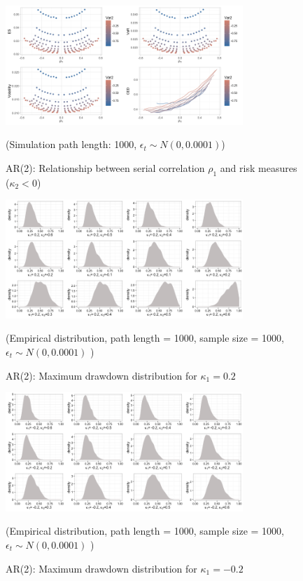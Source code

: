 \documentclass[11pt]{article}
\begin{document}
\begin{figure}[H]
\centering
\includegraphics[width = 0.8\textwidth]{../figures/simulation/AR2_risk_measures_neg}
\caption{AR(2): Relationship between serial correlation $\rho_1$ and risk measures ($\kappa_2 < 0$)}
(Simulation path length: 1000, $\epsilon_t \sim N(0, 0.0001)$)
\label{fig:AR2_risk_measures_neg}
\end{figure}

\begin{figure}[H]
\centering
\includegraphics[width = 0.8\textwidth]{../figures/simulation/AR2_maxDrawdown_dist_kappa1_02}
\caption{AR(2): Maximum drawdown distribution for $\kappa_1 = 0.2$}
(Empirical distribution, path length = 1000, sample size = 1000, $\epsilon_t \sim N(0, 0.0001)$ )
\label{fig:AR2_maxDrawdown_dist_kappa1_02}
\end{figure}

\begin{figure}[H]
\centering
\includegraphics[width = 0.8\textwidth]{../figures/simulation/AR2_maxDrawdown_dist_kappa1_-02}
\caption{AR(2): Maximum drawdown distribution for $\kappa_1 = -0.2$}
(Empirical distribution, path length = 1000, sample size = 1000, $\epsilon_t \sim N(0, 0.0001)$ )
\label{fig:AR2_maxDrawdown_dist_kappa1_-02}
\end{figure}
\end{document}
